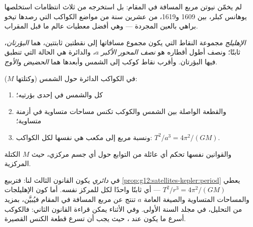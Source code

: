 لم يخمّن نيوتن مربع المسافة في المقام: بل استخرجه من ثلاث
انتظامات استخلصها يوهانس كبلر، بين 1609 و1619،
من عشرين سنة من مواضع الكواكب التي رصدها تيخو براهي بالعين المجردة ---
وهي أفضل معطيات عالم ما قبل المقراب.

\begin{definition}[الإهليلج]\label{def:g12:satellites-kepler:ellipse}
\emph{الإهليلج} مجموعة النقاط التي يكون مجموع
مسافاتها إلى نقطتين ثابتتين، هما \emph{البؤرتان}،
ثابتًا؛ ونصف أطول أقطاره هو
\emph{نصف المحور الأكبر} $a$، والدائرة
هي الحالة التي تنطبق فيها البؤرتان. وأقرب نقاط  كوكب إلى الشمس وأبعدها
هما \emph{الحضيض}
و\emph{الأوج}.
\end{definition}

\begin{theorem}\label{thm:g12:satellites-kepler:kepler}
%
في الكواكب الدائرة حول الشمس (وكتلتها $M$):
\begin{enumerate}
  \item كل   والشمس في إحدى بؤرتيه؛
  \item والقطعة الواصلة بين الشمس والكوكب تكنس مساحات متساوية في أزمنة متساوية؛
  \item ونسبة مربع  إلى مكعب  هي
        نفسها لكل الكواكب: $T^2/a^3 = 4\pi^2/(G M)$.
\end{enumerate}
والقوانين نفسها تحكم أي عائلة من التوابع حول أي جسم
مركزي، حيث $M$ الكتلة المركزية. \admitted
\end{theorem}

\begin{remark}\label{rem:g12:satellites-kepler:proof}
في  \emph{دائري} يكون القانون الثالث لنا: فتربيع
\cref{prop:g12:satellites-kepler:period} يعطي
$T^2/r^3 = 4\pi^2/(GM)$ --- أي ثابتًا واحدًا لكل  للمركز
نفسه. أما كون الإهليلجات والمساحات المتساوية والصيغة العامة $a$ تنتج
عن مربع المسافة في المقام فيُبيَّن، بمزيد من التحليل، في مجلد السنة الأولى.
وفي الأثناء يمكن قراءة القانون الثاني: فالكوكب أسرع ما يكون عند ،
حيث يجب أن تسرع قطعة الكنس القصيرة.
\end{remark}

